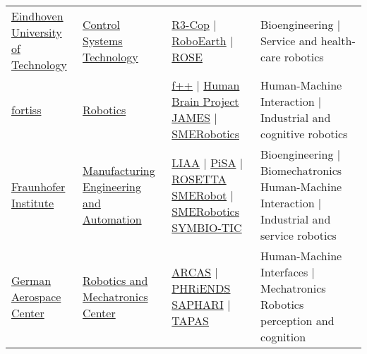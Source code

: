 \begin{table}[H]
\begin{tabu} { X[m,c] X[0.9,m,c] X[1.2,m,c] X[1.8,m,c] }

		\tabucline[1pt on 1.5pt off 3pt]{-}
		\href{https://www.tue.nl/en}{Eindhoven University of Technology} &
		\href{https://www.tue.nl/en/research/research-institutes/robotics-research/research-groups/control-systems-technology/}{Control Systems Technology} &
		\href{https://www.tue.nl/en/research/research-institutes/robotics-research/projects/r3-cop/}{R3-Cop} | \href{http://roboearth.org/}{RoboEarth} | \href{https://www.tue.nl/en/research/research-institutes/robotics-research/projects/rose/}{ROSE} &
		Bioengineering | Service and health-care robotics \\

		\tabucline[1pt on 1.5pt off 3pt]{-}
		\href{http://www.fortiss.org/en/home/}{fortiss} &
		\href{http://www.fortiss.org/en/research/research-topic/robotics/}{Robotics} &
		\href{http://www.fortiss.org/en/research/projects/fortiss_future_factory_f/}{f++} | \href{https://www.humanbrainproject.eu/}{Human Brain Project} \href{http://www.james-project.eu/}{JAMES} | \href{http://www.smerobotics.org/AUTOMATICA/exhibit-03-2016.html}{SMERobotics} &
		Human-Machine Interaction | Industrial and cognitive robotics \\

		\tabucline[1pt on 1.5pt off 3pt]{-}
		\href{https://www.fraunhofer.de/en.html}{Fraunhofer Institute} &
		\href{http://www.ipa.fraunhofer.de/en.html}{Manufacturing Engineering and Automation} &
		\href{http://www.project-leanautomation.eu}{LIAA} | \href{http://www.pisa-ip.org}{PiSA} | \href{http://www.fp7rosetta.org}{ROSETTA} \href{http://www.smerobot.org}{SMERobot} | \href{http://www.smerobotics.org/AUTOMATICA/exhibit-08-2016.html}{SMERobotics} \href{http://www.symbio-tic.eu}{SYMBIO-TIC} &
		Bioengineering | Biomechatronics Human-Machine Interaction | Industrial and service robotics \\

		\tabucline[1pt on 1.5pt off 3pt]{-}
		\href{http://www.dlr.de/dlr/en}{German Aerospace Center} &
		\href{http://www.dlr.de/rm/en}{Robotics and Mechatronics Center} &
		\href{http://www.arcas-project.eu}{ARCAS} | \href{http://www.phriends.eu/}{PHRiENDS} \href{http://www.saphari.eu}{SAPHARI} | \href{http://tapas-project.eu/}{TAPAS} &
		Human-Machine Interfaces | Mechatronics Robotics perception and cognition \\


\end{tabu}
\end{table}
